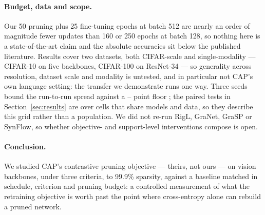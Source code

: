 \paragraph{Budget, data and scope.}
Our 50 pruning plus 25 fine-tuning epochs at batch 512 are nearly an order of
magnitude fewer updates than 160 \citep{liu2021granet} or 250 \citep{li2025east}
epochs at batch 128, so nothing here is a state-of-the-art claim and the
absolute accuracies sit below the published literature. Results cover two
datasets, both CIFAR-scale and single-modality --- CIFAR-10 on five backbones,
CIFAR-100 on ResNet-34 --- so generality across resolution, dataset scale and
modality is untested, and in particular not CAP's own language setting: the
transfer we demonstrate runs one way. Three seeds bound the run-to-run spread
against a --
point floor \citep{bouthillier2021variance}; the paired tests in
Section~\ref{sec:results} are over cells that share models and data, so they
describe this grid rather than a population. We did not re-run RigL, GraNet,
GraSP or SynFlow, so whether objective- and support-level interventions compose
is open.

\paragraph{Conclusion.}
We studied CAP's contrastive pruning objective \citep{xu2022cap} --- theirs, not
ours --- on vision backbones, under three criteria, to 99.9\% sparsity, against
a baseline matched in schedule, criterion and pruning budget: a controlled measurement of what the
retraining objective is worth past the point where cross-entropy alone can
rebuild a pruned network.
